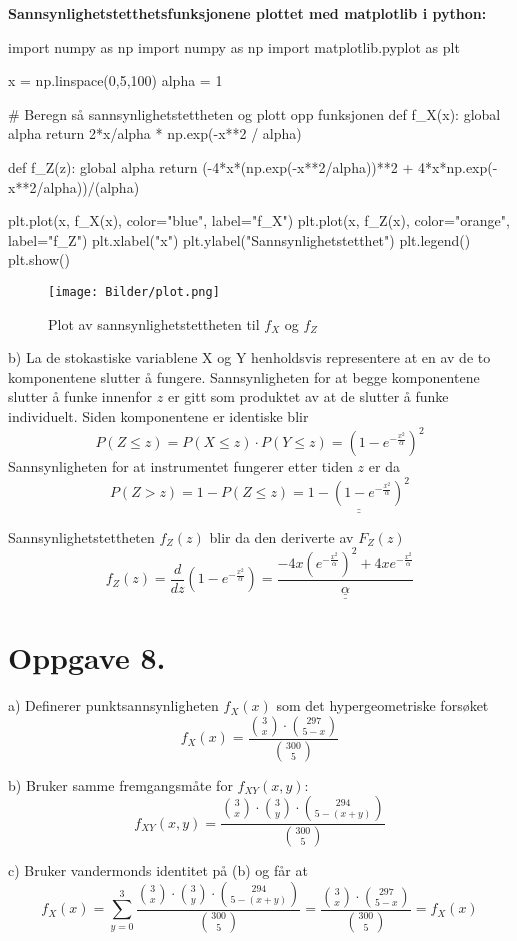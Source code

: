 \documentclass[a4paper,11pt,norsk]{article}
\begin{document}
\textbf{\large{Sannsynlighetstetthetsfunksjonene plottet med matplotlib i python:}}
\begin{pythoncode}
    import numpy as np
    import numpy as np
    import matplotlib.pyplot as plt

    x = np.linspace(0,5,100)
    alpha = 1

    # Beregn så sannsynlighetstettheten og plott opp funksjonen
    def f_X(x):
        global alpha
        return 2*x/alpha * np.exp(-x**2 / alpha)

    def f_Z(z):
        global alpha
        return (-4*x*(np.exp(-x**2/alpha))**2 + 4*x*np.exp(-x**2/alpha))/(alpha)

    plt.plot(x, f_X(x), color="blue", label="f_X")
    plt.plot(x, f_Z(x), color="orange", label="f_Z")
    plt.xlabel("x")
    plt.ylabel("Sannsynlighetstetthet")
    plt.legend()
    plt.show()
\end{pythoncode}

\begin{figure}[H]
    \center
    \texttt{[image: Bilder/plot.png]}
    \caption{\label{fig:The-caption}Plot av sannsynlighetstettheten til $f_{X}$ og $f_{Z}$}
\end{figure}

\newpage
b) La de stokastiske variablene X og Y henholdsvis representere at en av de to komponentene slutter å fungere.
Sannsynligheten for at begge komponentene slutter å funke innenfor $z$ er gitt som produktet av at de slutter å funke individuelt. 
Siden komponentene er identiske blir 
\[
    P(Z \leq z) = P(X \leq z) \cdot P(Y \leq z) = (1 - e^{-\frac{x^2}{\alpha}})^2
\]
Sannsynligheten for at instrumentet fungerer etter tiden $z$ er da
\[
    P(Z > z) = 1 - P(Z \leq z) = \underline{\underline{1 - (1 - e^{-\frac{x^2}{\alpha}})^2}}
\]

Sannsynlighetstettheten $f_{Z}(z)$ blir da den deriverte av $F_{Z}(z)$
\[
    f_{Z}(z) = \frac{d}{dz}\left(1 - e^{-\frac{x^2}{\alpha}}\right) = \underline{\underline{\frac{-4x\left(e^{-\frac{x^2}{\alpha}}\right)^2 + 4xe^{-\frac{x^2}{\alpha}}}{\alpha}}}
\]


\section*{Oppgave 8.}
a) Definerer punktsannsynligheten $f_{X}(x)$ som det hypergeometriske forsøket
\[
    f_{X}(x) = \frac{\binom{3}{x} \cdot \binom{297}{5-x}}{\binom{300}{5}}
\]

b) Bruker samme fremgangsmåte for $f_{XY}(x, y)$:
\[
    f_{XY}(x, y) = \frac{\binom{3}{x} \cdot \binom{3}{y} \cdot \binom{294}{5-(x+y)}}{\binom{300}{5}}
\]

c) Bruker vandermonds identitet på (b) og får at
\[
    f_{X}(x) = \sum_{y=0}^{3}{\frac{\binom{3}{x} \cdot \binom{3}{y} \cdot \binom{294}{5-(x+y)}}{\binom{300}{5}}} = \frac{\binom{3}{x} \cdot \binom{297}{5-x}}{\binom{300}{5}} = f_{X}(x)
\]
\end{document}
